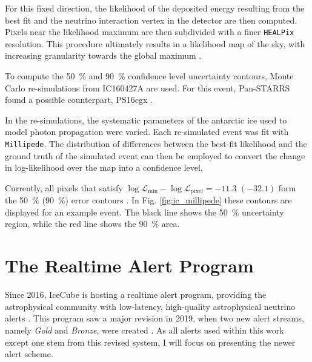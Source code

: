 For this fixed direction, the likelihood of the deposited energy resulting from the best fit and the neutrino interaction vertex in the detector are then computed. Pixels near the likelihood maximum are then subdivided with a finer \texttt{HEALPix} resolution. This procedure ultimately results in a likelihood map of the sky, with increasing granularity towards the global maximum .

To compute the \SI{50}{\percent} and \SI{90}{\percent} confidence level uncertainty contours, Monte Carlo re-simulations from IC160427A are used. For this event, Pan-STARRS found a possible counterpart, PS16cgx .

In the re-simulations, the systematic parameters of the antarctic ice used to model photon propagation were varied. Each re-simulated event was fit with \texttt{Millipede}. The distribution of differences between the best-fit likelihood and the ground truth of the simulated event can then be employed to convert the change in log-likelihood over the map into a confidence level.

Currently, all pixels that satisfy $\log \mathcal{L}_\text{min}-\log \mathcal{L}_\text{pixel} = -11.3$ $(-32.1)$ form the \SI{50}{\percent} (\SI{90}{\percent}) error contours . In Fig. \ref{fig:ic_millipede} these contours are displayed for an example event. The black line shows the \SI{50}{\percent} uncertainty region, while the red line shows the \SI{90}{\percent} area. 

\section{The Realtime Alert Program}\label{ic_alert_program}
Since 2016, IceCube is hosting a realtime alert program, providing the astrophysical community with low-latency, high-quality astrophysical neutrino alerts \cite{Aartsen2017a}. This program saw a major revision in 2019, when two new alert streams, namely \textit{Gold} and \textit{Bronze}, were created . As all alerts used within this work except one stem from this revised system, I will focus on presenting the newer alert scheme.


